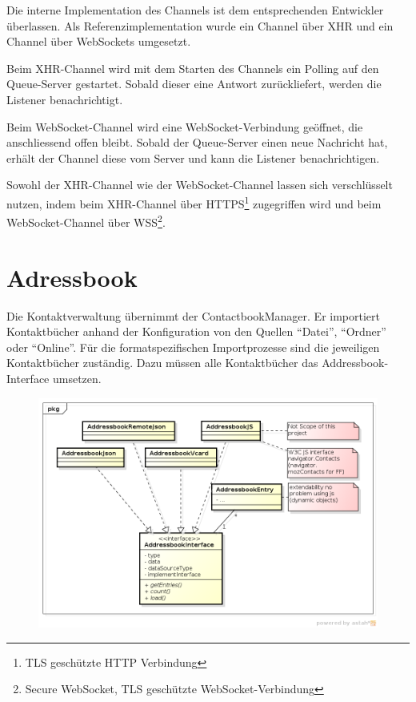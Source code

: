 	Die interne Implementation des Channels ist dem entsprechenden Entwickler
	überlassen. Als Referenzimplementation wurde ein Channel über XHR und ein Channel über WebSockets umgesetzt.
	
	Beim XHR-Channel wird mit dem Starten des Channels ein Polling auf den
	Queue-Server gestartet. Sobald dieser eine Antwort zurückliefert, werden die Listener benachrichtigt.
	
	Beim WebSocket-Channel wird eine WebSocket-Verbindung geöffnet, die
	anschliessend offen bleibt. Sobald der Queue-Server einen neue Nachricht hat, erhält der Channel diese vom Server und kann die Listener benachrichtigen.
	
	Sowohl der XHR-Channel wie der WebSocket-Channel lassen sich verschlüsselt
	nutzen, indem beim XHR-Channel über HTTPS\footnote{TLS geschützte HTTP Verbindung} zugegriffen wird und beim WebSocket-Channel über WSS\footnote{Secure WebSocket, TLS geschützte WebSocket-Verbindung}.
	

\section{Adressbook}
	Die Kontaktverwaltung übernimmt der ContactbookManager. Er importiert
	Kontaktbücher anhand der Konfiguration von den Quellen "`Datei"', "`Ordner"'
	oder "`Online"'. Für die format\-spezifischen Importprozesse sind die
	jeweiligen Kontaktbücher zuständig. Dazu müssen alle Kontaktbücher das Addressbook-Interface umsetzen.
	\begin{figure}[H]
		\centering
		\includegraphics[width=\textwidth]{../architekturanalayse/img/addressbook.png}
	\end{figure}

